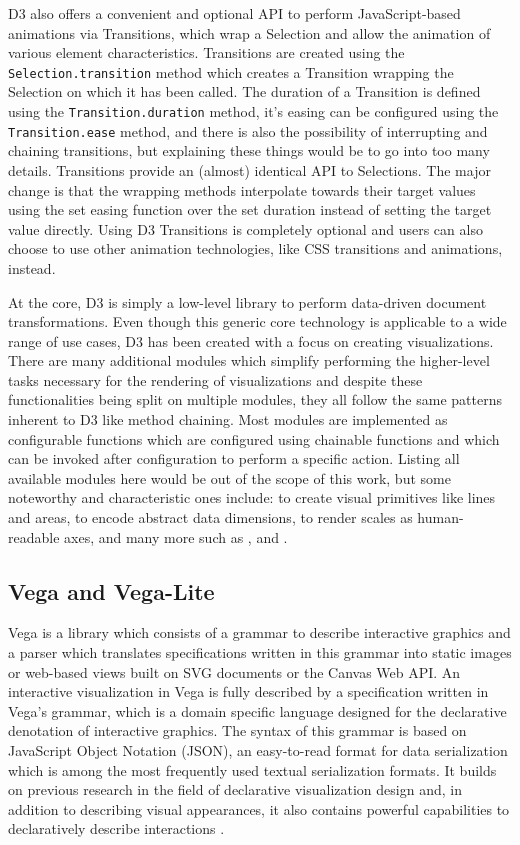 D3 also offers a convenient and optional API to perform JavaScript-based animations via Transitions, which wrap a Selection and allow the animation of various element characteristics.
Transitions are created using the \lstinline{Selection.transition} method which creates a Transition wrapping the Selection on which it has been called.
The duration of a Transition is defined using the \lstinline{Transition.duration} method, it's easing can be configured using the \lstinline{Transition.ease} method, and there is also the possibility of interrupting and chaining transitions, but explaining these things would be to go into too many details.
Transitions provide an (almost) identical API to Selections.
The major change is that the wrapping methods interpolate towards their target values using the set easing function over the set duration instead of setting the target value directly.
Using D3 Transitions is completely optional and users can also choose to use other animation technologies, like CSS transitions and animations, instead.

At the core, D3 is simply a low-level library to perform data-driven document transformations.
Even though this generic core technology is applicable to a wide range of use cases, D3 has been created with a focus on creating visualizations.
There are many additional modules which simplify performing the higher-level tasks necessary for the rendering of visualizations and despite these functionalities being split on multiple modules, they all follow the same patterns inherent to D3 like method chaining.
Most modules are implemented as configurable functions which are configured using chainable functions and which can be invoked after configuration to perform a specific action.
Listing all available modules here would be out of the scope of this work, but some noteworthy and characteristic ones include:  to create visual primitives like lines and areas,  to encode abstract data dimensions,  to render scales as human-readable axes, and many more such as ,  and .

\subsection{Vega and Vega-Lite}

Vega \parencite{Vega} is a library which consists of a grammar to describe interactive graphics and a parser which translates specifications written in this grammar into static images or web-based views built on SVG documents or the Canvas Web API.
An interactive visualization in Vega is fully described by a specification written in Vega's grammar, which is a domain specific language designed for the declarative denotation of interactive graphics.
The syntax of this grammar is based on JavaScript Object Notation (JSON), an easy-to-read format for data serialization which is among the most frequently used textual serialization formats.
It builds on previous research in the field of declarative visualization design \parencite{GrammarOfGraphics} and, in addition to describing visual appearances, it also contains powerful capabilities to declaratively describe interactions \parencite{ReactiveVega}.

